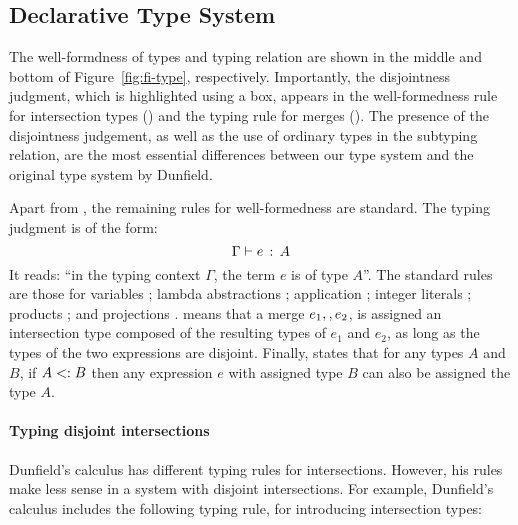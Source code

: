 
\subsection{Declarative Type System}

The well-formdness of types and typing relation are shown in the
middle and bottom of Figure~\ref{fig:fi-type}, respectively.
Importantly, the disjointness judgment, which is highlighted using a
box, appears in the well-formedness rule for intersection types () and 
the typing rule for merges (). The presence of
the disjointness judgement, as well as the use of ordinary types in
the subtyping relation, are the most essential differences between our type system and the
original type system by Dunfield. 


Apart from , the remaining rules for 
well-formedness are standard. The typing judgment is of the form:
\[ \Gamma \vdash e \ \!:\! \ A \]
It reads: ``in the typing context $\Gamma$, the term $e$ is of type
$A$''. The standard rules are those for 
variables ; lambda abstractions ; 
application ; integer literals ;
products ; and projections . 
 means that a merge
$e_1 ,, e_2$, is assigned an intersection type composed of the
resulting types of $e_1$ and $e_2$, as long as the types of the two
expressions are disjoint.
Finally,  states that for any types $A$ and $B$, if
$A <: B$ then any expression $e$ with assigned type $B$ can also be assigned 
the type $A$.

\paragraph{Typing disjoint intersections}
Dunfield's calculus has different typing rules for intersections.
%
However, his rules
make less sense in a system with disjoint intersections. For example, 
Dunfield's calculus includes the following typing rule, for
introducing intersection types:

